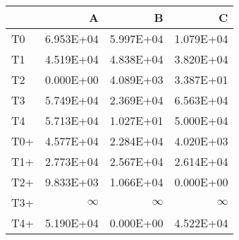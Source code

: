 \begin{tabular}{lrrr}
\toprule
     &           A &           B &           C \\
\midrule
 T0  &   \num{6.953E+04} &   \num{5.997E+04} &   \num{1.079E+04} \\
 T1  &   \num{4.519E+04} &   \num{4.838E+04} &   \num{3.820E+04} \\
 T2  &   \num{0.000E+00} &   \num{4.089E+03} &   \num{3.387E+01} \\
 T3  &   \num{5.749E+04} &   \num{2.369E+04} &   \num{6.563E+04} \\
 T4  &   \num{5.713E+04} &   \num{1.027E+01} &   \num{5.000E+04} \\
 T0+ &   \num{4.577E+04} &   \num{2.284E+04} &   \num{4.020E+03} \\
 T1+ &   \num{2.773E+04} &   \num{2.567E+04} &   \num{2.614E+04} \\
 T2+ &   \num{9.833E+03} &   \num{1.066E+04} &   \num{0.000E+00} \\
 T3+ &$\infty$        &$\infty$        &$\infty$        \\
 T4+ &   \num{5.190E+04} &   \num{0.000E+00} &   \num{4.522E+04} \\
\bottomrule
\end{tabular}